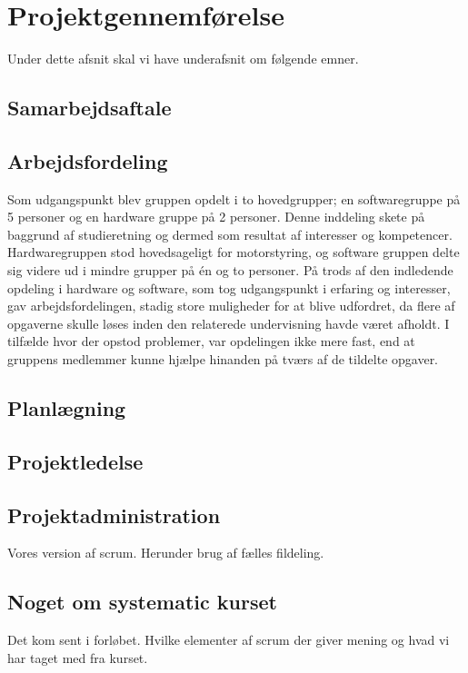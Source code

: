 \chapter{Projektgennemførelse}

Under dette afsnit skal vi have underafsnit om følgende emner.


\section{Samarbejdsaftale}

\section{Arbejdsfordeling}
Som udgangspunkt blev gruppen opdelt i to hovedgrupper; en softwaregruppe på 5 personer og en hardware gruppe på 2 personer. Denne inddeling skete på baggrund af studieretning og dermed som resultat af interesser og kompetencer. Hardwaregruppen stod hovedsageligt for motorstyring, og software gruppen delte sig videre ud i mindre grupper på én og to personer. På trods af den indledende opdeling i hardware og software, som tog udgangspunkt i erfaring og interesser, gav arbejdsfordelingen, stadig store muligheder for at blive udfordret, da flere af opgaverne skulle løses inden den relaterede undervisning havde været afholdt. I tilfælde hvor der opstod problemer, var opdelingen ikke mere fast, end at gruppens medlemmer kunne hjælpe hinanden på tværs af de tildelte opgaver. \\

\section{Planlægning}

\section{Projektledelse}

\section{Projektadministration}
Vores version af scrum.
Herunder brug af fælles fildeling.

\section{Noget om systematic kurset}
Det kom sent i forløbet. 
Hvilke elementer af scrum der giver mening og hvad vi har taget med fra kurset. 

